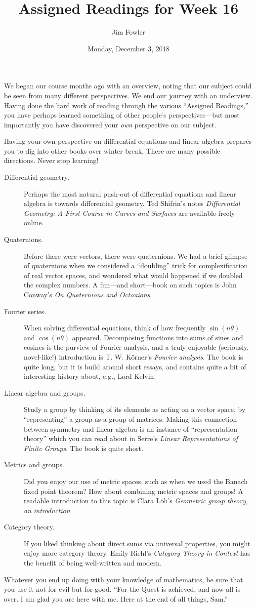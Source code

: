 \documentclass{homework}
\author{Jim Fowler}
\title{Assigned Readings for Week 16}
\date{Monday, December 3, 2018}
\begin{document}
\maketitle


We began our course months ago with an overview, noting that our
subject could be seen from many different perspectives.  We end our
journey with an underview.  Having done the hard work of reading
through the various ``Assigned Readings,'' you have perhaps learned
something of other people's perspectives---but most importantly you
have discovered your \textit{own} perspective on our subject.

Having your own perspective on differential equations and linear
algebra prepares you to dig into other books over winter break.  There
are many possible directions.  Never stop learning!
\begin{description}
\item[Differential geometry.] Perhaps the most natural push-out of
  differential equations and linear algebra is towards differential
  geometry.  Ted Shifrin's notes \textit{Differential Geometry: A
    First Course in Curves and Surfaces} are available freely online.
\item[Quaternions.] Before there were vectors, there were quaternions.
  We had a brief glimpse of quaternions when we considered a
  ``doubling'' trick for complexification of real vector spaces, and
  wondered what would happened if we doubled the complex numbers.  A
  fun---and short---book on such topics is John Conway's \textit{On
    Quaternions and Octonions}.
\item[Fourier series.] When solving differential equations, think of
  how frequently $\sin(n\theta)$ and $\cos(n\theta)$ appeared.
  Decomposing functions into sums of sines and cosines is the purview
  of Fourier analysis, and a truly enjoyable (seriously, novel-like!)
  introduction is T. W. K\"orner's \textit{Fourier analysis}.  The
  book is quite long, but it is build around short essays, and
  contains quite a bit of interesting history about, e.g., Lord
  Kelvin.
\item[Linear algebra and groups.] Study a group by thinking of its
  elements as acting on a vector space, by ``representing'' a group as
  a group of matrices.  Making this connection between symmetry and
  linear algebra is an instance of ``representation theory'' which you
  can read about in Serre's \textit{Linear Representations of Finite
    Groups}.  The book is quite short.
\item[Metrics and groups.] Did you enjoy our use of metric spaces, such
  as when we used the Banach fixed point theorem?  How about combining
  metric spaces and groups!  A readable introduction to this topic is
  Clara L\"oh's \textit{Geometric group theory, an introduction}.
\item[Category theory.] If you liked thinking about direct sums via
  universal properties, you might enjoy more category theory.  Emily
  Riehl's \textit{Category Theory in Context} has the benefit of being
  well-written and modern.
\end{description}
Whatever you end up doing with your knowledge of mathematics, be sure
that you use it not for evil but for good.  ``For the Quest is
achieved, and now all is over.  I am glad you are here with me.  Here
at the end of all things, Sam.'' %
\end{document}
